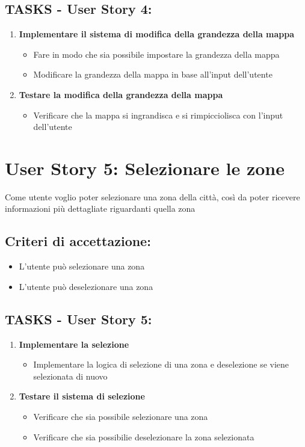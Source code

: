 \subsection*{TASKS - User Story 4:}  
\begin{enumerate}  
    \item \textbf{Implementare il sistema di modifica della grandezza della mappa}  
        \begin{itemize}  
            \item Fare in modo che sia possibile impostare la grandezza della mappa
            \item Modificare la grandezza della mappa in base all'input dell'utente
        \end{itemize}  
    \item \textbf{Testare la modifica della grandezza della mappa}  
        \begin{itemize}  
            \item Verificare che la mappa si ingrandisca e si rimpicciolisca con l'input dell'utente
        \end{itemize}  
\end{enumerate}
\section*{User Story 5: Selezionare le zone}  
    Come utente voglio poter selezionare una zona della città, così da poter ricevere informazioni più dettagliate riguardanti quella zona
    \subsection*{Criteri di accettazione:}  
    \begin{itemize}  
        \item L'utente può selezionare una zona
        \item L'utente può deselezionare una zona
    \end{itemize}  
    \subsection*{TASKS - User Story 5:}  
    \begin{enumerate}  
        \item \textbf{Implementare la selezione}  
            \begin{itemize}  
                \item Implementare la logica di selezione di una zona e deselezione se viene selezionata di nuovo
            \end{itemize}  
        \item \textbf{Testare il sistema di selezione}  
            \begin{itemize}  
                \item Verificare che sia possibile selezionare una zona
                \item Verificare che sia possibilie deselezionare la zona selezionata
            \end{itemize}  
    \end{enumerate}
